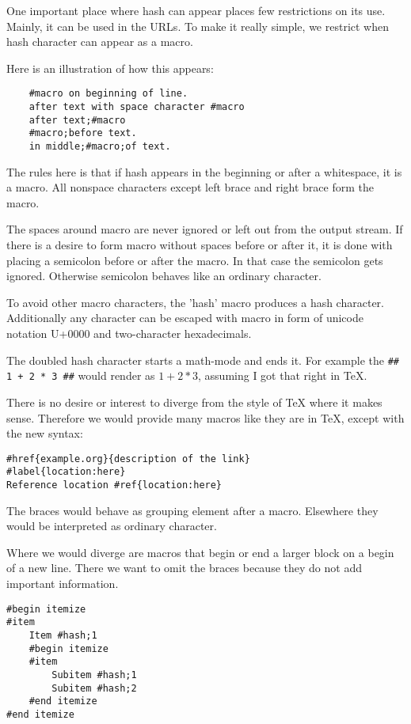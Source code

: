 \documentclass{article}
\begin{document}
One important place where hash can appear places few
restrictions on its use. Mainly, it can be used in the URLs.
To make it really simple, we restrict when hash character
can appear as a macro.

Here is an illustration of how this appears:

\begin{verbatim}
    #macro on beginning of line.
    after text with space character #macro
    after text;#macro
    #macro;before text.
    in middle;#macro;of text.
\end{verbatim}

The rules here is that if hash appears in the beginning or
after a whitespace, it is a macro. All nonspace characters
except left brace and right brace form the macro.

The spaces around macro are never ignored or left out from
the output stream. If there is a desire to form macro
without spaces before or after it, it is done with placing a
semicolon before or after the macro. In that case the
semicolon gets ignored. Otherwise semicolon behaves like an
ordinary character.

To avoid other macro characters, the 'hash' macro
produces a hash character. Additionally any character can be
escaped with macro in form of unicode notation U+0000 and
two-character hexadecimals.

The doubled hash character starts a math-mode and ends it.
For example the \verb=## 1 + 2 * 3 ##= would render
as $ 1 + 2 * 3 $, assuming I got that right in TeX.

There is no desire or interest to diverge from the style of
TeX where it makes sense. Therefore we would provide many
macros like they are in TeX, except with the new syntax:

\begin{verbatim}
#href{example.org}{description of the link}
#label{location:here}
Reference location #ref{location:here}
\end{verbatim}

The braces would behave as grouping element after a macro.
Elsewhere they would be interpreted as ordinary character.

Where we would diverge are macros that begin or end a
larger block on a begin of a new line. There we want to omit
the braces because they do not add important information.

\begin{verbatim}
#begin itemize
#item
    Item #hash;1
    #begin itemize
    #item
        Subitem #hash;1
        Subitem #hash;2
    #end itemize
#end itemize
\end{verbatim}
\end{document}
